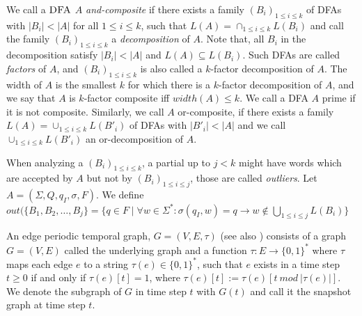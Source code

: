 We call a $\textsc{DFA}$ $A$ \textit{and-composite} if there exists a family $(B_i)_{1 \leq i \leq k}$ of DFAs with $|B_i| < |A|$ for all $1 \leq i \leq k$, such that $L(A) = \cap_{1\leq i \leq k} L(B_i)$ and call the family $(B_i)_{1\leq i \leq k}$ a \textit{decomposition} of $A$. Note that, all $B_i$ in the decomposition satisfy $|B_i| < |A|$ and $L(A) \subseteq L(B_i)$. Such DFAs are called \textit{factors} of $A$, and $(B_i)_{1\leq i \leq k}$ is also called a $k$-factor decomposition of $A$. The
width of $A$ is the smallest $k$ for which there is a $k$-factor decomposition of $A$, and we say that $A$ is $k$-factor composite iff $width(A) \leq k$. We call a DFA $A$ prime if it is not composite. Similarly, we call $A$ or-composite, if there exists a family $L(A) = \cup_{1\leq i \leq k} L(B'_i)$ of DFAs with $|B'_i| < |A|$
and we call $\cup_{1\leq i \leq k} L(B'_i)$ an or-decomposition of $A$.

When analyzing a \orDecomp $(B_i)_{1 \leq i \leq k}$, a partial \orDecomp up to $j < k$ might have words which are accepted by $A$ but not by $(B_i)_{1 \leq i \leq j}$, those are called \textit{outliers}. Let $A = (\Sigma, Q, q_I, \sigma, F)$. We define $out(\{B_1, B_2, \dots, B_j\} = \{q \in F \mid \forall w \in \Sigma^* \colon \sigma(q_I, w) = q \rightarrow w \notin \bigcup_{1\leq i \leq j} L(B_i)\}$

An edge periodic temporal graph, $G = (V, E, \tau)$ (see also \cite{erlebach2020game}) consists of a graph $G = (V, E)$ called the underlying graph and a function $\tau : E \rightarrow \{0, 1\}^*$ where $\tau$ maps each edge $e$ to a string $\tau(e) \in \{0, 1\}^*$, such that $e$ exists in a time step $t \geq 0$ if and only if $\tau(e)[t] = 1$, where $\tau(e)[t] := \tau(e)[t~ mod~ |\tau(e)|]$. We denote the subgraph of $G$ in time step $t$ with $G(t)$ and call it the snapshot graph at time step $t$.

